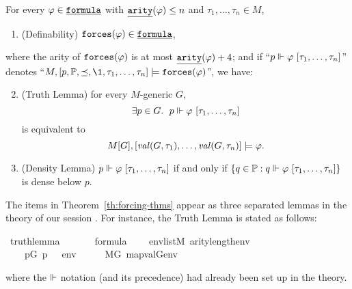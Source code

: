 \begin{theorem}\label{th:forcing-thms}
  For every
  $\phi\in\formula$ with $\isatt{arity}(\phi)\leq n$ and $\tau_1,\dots,\tau_n\in M$,
  \begin{enumerate}
  \item\label{item:definability} (Definability)
    $\forceisa(\phi)\in\formula$, 
  \end{enumerate}
  where the 
  arity of $\mathop{\mathtt{forces}}(\varphi)$ is at most $\isatt{arity}(\phi) + 4$; and if
  “$p \forces \phi\ [\tau_1,\dots,\tau_n]$”
  denotes
  “$M, [p,\PP,\preceq,\1, \tau_1,\dots,\tau_n]  \models
  \forceisa(\phi)$”, we have:
  \begin{enumerate}
    \setcounter{enumi}{1}
  \item\label{item:truth-lemma} (Truth Lemma) for every $M$-generic $G$,
    \[
      \exists p\in G.\ \; p \forces \phi\ [\tau_1,\dots,\tau_n]
    \]
    is equivalent to 
    \[
      M[G], [\operatorname{\mathit{val}}(G,\tau_1),\dots,\operatorname{\mathit{val}}(G,\tau_n)]
      \models \varphi.
    \]
  \item \label{item:density-lemma} (Density Lemma) $p \forces \phi\ [\tau_1,\dots,\tau_n]$
    if and only if 
    $\{q\in \PP :  q \forces \phi\ [\tau_1,\dots,\tau_n]\}$
    is dense below $p$.
  \end{enumerate}
\end{theorem}
The items in Theorem~\ref{th:forcing-thms} appear as three
separated lemmas in the theory
 of our
 session \cite{Independence_CH-AFP}.
For instance, the Truth Lemma is stated as
follows:
\begin{isabelle}
\isamarkupfalse%
\ truth{\isacharunderscore}{\kern0pt}lemma{\isacharcolon}{\kern0pt}\isanewline
\ \ \isanewline
\ \ \ \ {\isachardoublequoteopen}{\isasymphi}{\isasymin}formula{\isachardoublequoteclose}\isanewline
\ \ \ \ {\isachardoublequoteopen}env{\isasymin}list{\isacharparenleft}{\kern0pt}M{\isacharparenright}{\kern0pt}{\isachardoublequoteclose}\ {\isachardoublequoteopen}arity{\isacharparenleft}{\kern0pt}{\isasymphi}{\isacharparenright}{\kern0pt}{\isasymle}length{\isacharparenleft}{\kern0pt}env{\isacharparenright}{\kern0pt}{\isachardoublequoteclose}\isanewline
\ \ \isanewline
\ \ \ \ {\isachardoublequoteopen}{\isacharparenleft}{\kern0pt}{\isasymexists}p{\isasymin}G{\isachardot}{\kern0pt}\ p\ {\isasymtturnstile}\ {\isasymphi}\ env{\isacharparenright}{\kern0pt}\ \ \ {\isasymlongleftrightarrow}\ \ \ M{\isacharbrackleft}{\kern0pt}G{\isacharbrackright}{\kern0pt}{\isacharcomma}{\kern0pt}\ map{\isacharparenleft}{\kern0pt}val{\isacharparenleft}{\kern0pt}G{\isacharparenright}{\kern0pt}{\isacharcomma}{\kern0pt}env{\isacharparenright}{\kern0pt}\ {\isasymTurnstile}\ {\isasymphi}{\isachardoublequoteclose}
\end{isabelle}
where the $\Vdash$ notation (and its precedence) had already been set up in the
 theory.

